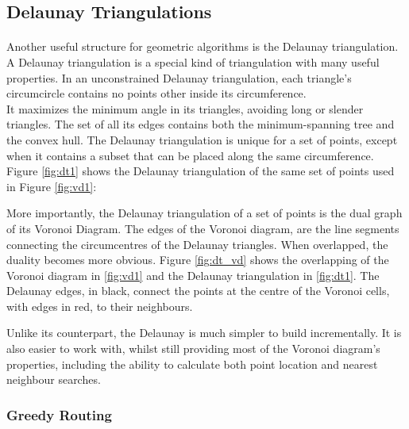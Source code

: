 \subsection{Delaunay Triangulations}
\paragraph{}
Another useful structure for geometric algorithms is the Delaunay triangulation.
A Delaunay triangulation is a special kind of triangulation with many useful properties. 
In an unconstrained Delaunay triangulation, each triangle's circumcircle contains no points other inside its circumference.\\
It maximizes the minimum angle in its triangles, avoiding long or slender triangles.
The set of all its edges contains both the minimum-spanning tree and the convex hull.
The Delaunay triangulation is unique for a set of points, except when it contains a subset that can be placed along the same circumference. Figure \ref{fig:dt1} shows the Delaunay triangulation of the same set of points used in Figure \ref{fig:vd1}:

\noindent
More importantly, the Delaunay triangulation of a set of points is the dual graph of its Voronoi Diagram. The edges of the Voronoi diagram, are the line segments connecting the circumcentres of the Delaunay triangles. When overlapped, the duality becomes more obvious. Figure \ref{fig:dt_vd} shows the overlapping of the Voronoi diagram in \ref{fig:vd1} and the Delaunay  triangulation in \ref{fig:dt1}. The Delaunay edges, in black, connect the points at the centre of the Voronoi cells, with edges in red, to their neighbours.

\noindent
Unlike its counterpart, the Delaunay is much simpler to build incrementally. It is also easier to work with, whilst still providing most of the Voronoi diagram's properties, including the ability to calculate both point location and nearest neighbour searches.
\subsubsection{Greedy Routing}
\label{r:gr}
